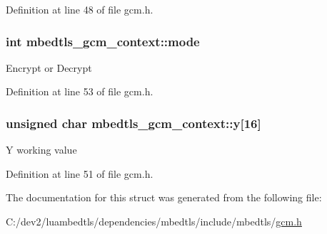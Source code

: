 Definition at line 48 of file gcm.\-h.

\hypertarget{structmbedtls__gcm__context_a48f2fbbac9f7bb46411fea24ac433628}{
\subsubsection[{mode}]{\setlength{\rightskip}{0pt plus 5cm}int mbedtls\-\_\-gcm\-\_\-context\-::mode}}\label{structmbedtls__gcm__context_a48f2fbbac9f7bb46411fea24ac433628}
Encrypt or Decrypt 

Definition at line 53 of file gcm.\-h.

\hypertarget{structmbedtls__gcm__context_a1a7eb48ed5911aeb2dd983da6cfd32bb}{
\subsubsection[{y}]{\setlength{\rightskip}{0pt plus 5cm}unsigned char mbedtls\-\_\-gcm\-\_\-context\-::y\mbox{[}16\mbox{]}}}\label{structmbedtls__gcm__context_a1a7eb48ed5911aeb2dd983da6cfd32bb}
Y working value 

Definition at line 51 of file gcm.\-h.



The documentation for this struct was generated from the following file\-:\begin{DoxyCompactItemize}
\item 
C\-:/dev2/luambedtls/dependencies/mbedtls/include/mbedtls/\hyperlink{gcm_8h}{gcm.\-h}\end{DoxyCompactItemize}
